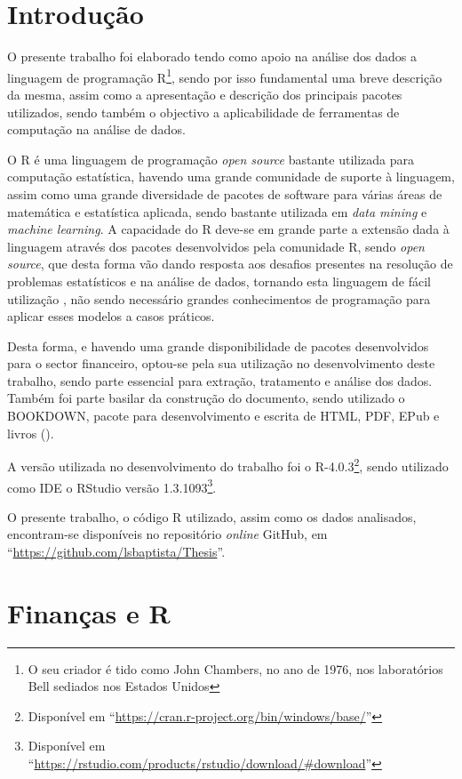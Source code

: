 \documentclass[
  12pt,
  a4paper,
  openany]{book}
\begin{document}
\hypertarget{introduuxe7uxe3o}{%
\section{Introdução}\label{introduuxe7uxe3o}}

O presente trabalho foi elaborado tendo como apoio na análise dos dados a linguagem de programação R\footnote{O seu criador é tido como John Chambers, no ano de 1976, nos laboratórios Bell sediados nos Estados Unidos}, sendo por isso fundamental uma breve descrição da mesma, assim como a apresentação e descrição dos principais pacotes utilizados, sendo também o objectivo a aplicabilidade de ferramentas de computação na análise de dados.

O R é uma linguagem de programação \emph{open source} bastante utilizada para computação estatística, havendo uma grande comunidade de suporte à linguagem, assim como uma grande diversidade de pacotes de software para várias áreas de matemática e estatística aplicada, sendo bastante utilizada em \emph{data mining} e \emph{machine learning}. A capacidade do R deve-se em grande parte a extensão dada à linguagem através dos pacotes desenvolvidos pela comunidade R, sendo \emph{open source}, que desta forma vão dando resposta aos desafios presentes na resolução de problemas estatísticos e na análise de dados, tornando esta linguagem de fácil utilização , não sendo necessário grandes conhecimentos de programação para aplicar esses modelos a casos práticos.

Desta forma, e havendo uma grande disponibilidade de pacotes desenvolvidos para o sector financeiro, optou-se pela sua utilização no desenvolvimento deste trabalho, sendo parte essencial para extração, tratamento e análise dos dados. Também foi parte basilar da construção do documento, sendo utilizado o BOOKDOWN, pacote para desenvolvimento e escrita de HTML, PDF, EPub e livros (\citet{R-bookdown}).

A versão utilizada no desenvolvimento do trabalho foi o R-4.0.3\footnote{Disponível em ``\url{https://cran.r-project.org/bin/windows/base/}''}, sendo utilizado como IDE o RStudio versão 1.3.1093\footnote{Disponível em ``\url{https://rstudio.com/products/rstudio/download/\#download}''}.

O presente trabalho, o código R utilizado, assim como os dados analisados, encontram-se disponíveis no repositório \emph{online} GitHub, em ``\url{https://github.com/lsbaptista/Thesis}''.

\hypertarget{finanuxe7as-e-r}{%
\section{Finanças e R}\label{finanuxe7as-e-r}}
\end{document}
